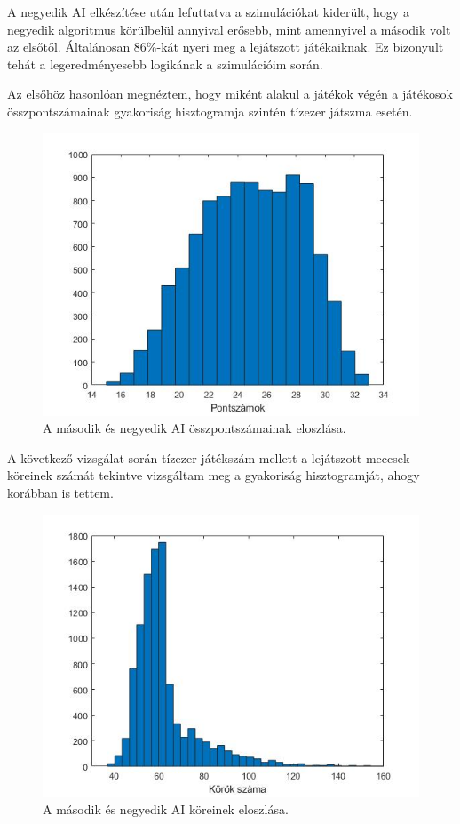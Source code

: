 
A negyedik AI elkészítése után lefuttatva a szimulációkat kiderült, hogy a negyedik algoritmus körülbelül annyival erősebb, mint amennyivel a második volt az elsőtől. Általánosan 86\%-kát nyeri meg a lejátszott játékaiknak. Ez bizonyult tehát a legeredményesebb logikának a szimulációim során.\par

Az elsőhöz hasonlóan megnéztem, hogy miként alakul a játékok végén a játékosok összpontszámainak gyakoriság hisztogramja szintén tízezer játszma esetén.

\begin{figure}[h]
\centering
\includegraphics[scale=0.55]{images/final_scores_AI2vsAI4.jpg}
\caption{A második és negyedik AI összpontszámainak eloszlása.}
\label{fig:scores2v4}
\end{figure}

A következő vizsgálat során tízezer játékszám mellett a lejátszott meccsek köreinek számát tekintve vizsgáltam meg a gyakoriság hisztogramját, ahogy korábban is tettem.

\begin{figure}[h]
\centering
\includegraphics[scale=0.55]{images/round_number_hist_AI2vsAI4.jpg}
\caption{A második és negyedik AI köreinek eloszlása.}
\label{fig:rounds2v4}
\end{figure}


